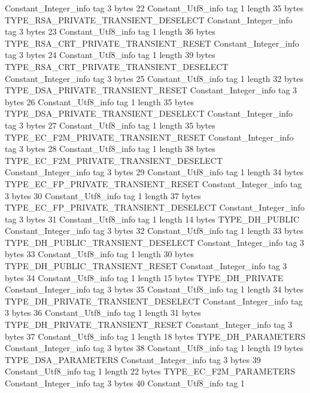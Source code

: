 {{{		}
		Constant_Integer_info {
			tag	3
			bytes	22
		}
		Constant_Utf8_info {
			tag	1
			length	35
			bytes	TYPE_RSA_PRIVATE_TRANSIENT_DESELECT
		}
		Constant_Integer_info {
			tag	3
			bytes	23
		}
		Constant_Utf8_info {
			tag	1
			length	36
			bytes	TYPE_RSA_CRT_PRIVATE_TRANSIENT_RESET
		}
		Constant_Integer_info {
			tag	3
			bytes	24
		}
		Constant_Utf8_info {
			tag	1
			length	39
			bytes	TYPE_RSA_CRT_PRIVATE_TRANSIENT_DESELECT
		}
		Constant_Integer_info {
			tag	3
			bytes	25
		}
		Constant_Utf8_info {
			tag	1
			length	32
			bytes	TYPE_DSA_PRIVATE_TRANSIENT_RESET
		}
		Constant_Integer_info {
			tag	3
			bytes	26
		}
		Constant_Utf8_info {
			tag	1
			length	35
			bytes	TYPE_DSA_PRIVATE_TRANSIENT_DESELECT
		}
		Constant_Integer_info {
			tag	3
			bytes	27
		}
		Constant_Utf8_info {
			tag	1
			length	35
			bytes	TYPE_EC_F2M_PRIVATE_TRANSIENT_RESET
		}
		Constant_Integer_info {
			tag	3
			bytes	28
		}
		Constant_Utf8_info {
			tag	1
			length	38
			bytes	TYPE_EC_F2M_PRIVATE_TRANSIENT_DESELECT
		}
		Constant_Integer_info {
			tag	3
			bytes	29
		}
		Constant_Utf8_info {
			tag	1
			length	34
			bytes	TYPE_EC_FP_PRIVATE_TRANSIENT_RESET
		}
		Constant_Integer_info {
			tag	3
			bytes	30
		}
		Constant_Utf8_info {
			tag	1
			length	37
			bytes	TYPE_EC_FP_PRIVATE_TRANSIENT_DESELECT
		}
		Constant_Integer_info {
			tag	3
			bytes	31
		}
		Constant_Utf8_info {
			tag	1
			length	14
			bytes	TYPE_DH_PUBLIC
		}
		Constant_Integer_info {
			tag	3
			bytes	32
		}
		Constant_Utf8_info {
			tag	1
			length	33
			bytes	TYPE_DH_PUBLIC_TRANSIENT_DESELECT
		}
		Constant_Integer_info {
			tag	3
			bytes	33
		}
		Constant_Utf8_info {
			tag	1
			length	30
			bytes	TYPE_DH_PUBLIC_TRANSIENT_RESET
		}
		Constant_Integer_info {
			tag	3
			bytes	34
		}
		Constant_Utf8_info {
			tag	1
			length	15
			bytes	TYPE_DH_PRIVATE
		}
		Constant_Integer_info {
			tag	3
			bytes	35
		}
		Constant_Utf8_info {
			tag	1
			length	34
			bytes	TYPE_DH_PRIVATE_TRANSIENT_DESELECT
		}
		Constant_Integer_info {
			tag	3
			bytes	36
		}
		Constant_Utf8_info {
			tag	1
			length	31
			bytes	TYPE_DH_PRIVATE_TRANSIENT_RESET
		}
		Constant_Integer_info {
			tag	3
			bytes	37
		}
		Constant_Utf8_info {
			tag	1
			length	18
			bytes	TYPE_DH_PARAMETERS
		}
		Constant_Integer_info {
			tag	3
			bytes	38
		}
		Constant_Utf8_info {
			tag	1
			length	19
			bytes	TYPE_DSA_PARAMETERS
		}
		Constant_Integer_info {
			tag	3
			bytes	39
		}
		Constant_Utf8_info {
			tag	1
			length	22
			bytes	TYPE_EC_F2M_PARAMETERS
		}
		Constant_Integer_info {
			tag	3
			bytes	40
		}
		Constant_Utf8_info {
			tag	1
}}}
